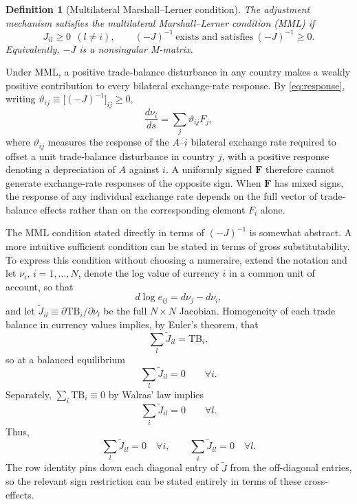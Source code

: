 \documentclass[11pt]{article}
\newtheorem{definition}[theorem]{Definition}
\begin{document}
\begin{definition}[Multilateral Marshall--Lerner condition]
The adjustment mechanism satisfies the \emph{multilateral Marshall--Lerner condition} (MML) if
\begin{equation}
J_{il}\geq0 \ \ (l\neq i), \qquad (-J)^{-1}\ \text{exists and satisfies}\ (-J)^{-1}\geq0 .
\label{eq:invpos}
\end{equation}
Equivalently, $-J$ is a nonsingular M-matrix.
\end{definition}

Under MML, a positive trade-balance disturbance in any country makes a weakly positive contribution to every bilateral exchange-rate response. By \eqref{eq:response}, writing $\vartheta_{ij}\equiv\big[(-J)^{-1}\big]_{ij}\geq0$,
\begin{equation}
\frac{d\nu_i}{ds}=\sum_j\vartheta_{ij}F_j ,
\label{eq:signrule}
\end{equation}
where $\vartheta_{ij}$ measures the response of the $A$--$i$ bilateral exchange rate required to offset a unit trade-balance disturbance in country $j$, with a positive response denoting a depreciation of $A$ against $i$. A uniformly signed $\boldsymbol{F}$ therefore cannot generate exchange-rate responses of the opposite sign. When $\boldsymbol{F}$ has mixed signs, the response of any individual exchange rate depends on the full vector of trade-balance effects rather than on the corresponding element $F_i$ alone.

The MML condition stated directly in terms of $(-J)^{-1}$ is somewhat abstract. A more intuitive sufficient condition can be stated in terms of gross substitutability. To express this condition without choosing a numeraire, extend the notation and let $\nu_i$, $i=1,\dots,N$, denote the log value of currency $i$ in a common unit of account, so that
\[
d\log e_{ij}=d\nu_j-d\nu_i,
\]
and let $\widetilde J_{il}\equiv\partial\mathrm{TB}_i/\partial\nu_l$ be the full $N\times N$ Jacobian. Homogeneity of each trade balance in currency values implies, by Euler's theorem, that
\[
\sum_l \widetilde J_{il}=\mathrm{TB}_i,
\]
so at a balanced equilibrium
\[
\sum_l \widetilde J_{il}=0 \qquad \forall i.
\]
Separately, $\sum_i\mathrm{TB}_i\equiv0$ by Walras' law implies
\[
\sum_i \widetilde J_{il}=0 \qquad \forall l.
\]
Thus,
\begin{equation}
\sum_l \widetilde J_{il}=0 \quad \forall i, \qquad \sum_i \widetilde J_{il}=0 \quad \forall l .
\label{eq:hom}
\end{equation}
The row identity pins down each diagonal entry of $\widetilde J$ from the off-diagonal entries, so the relevant sign restriction can be stated entirely in terms of these cross-effects.
\end{document}
